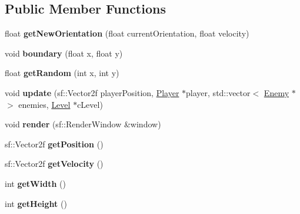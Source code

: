 \subsection*{Public Member Functions}
\begin{DoxyCompactItemize}
\item 
\mbox{\label{class_alien___nest_ab95047267d26135822ca8e7e0bc9db4c}} 
float {\bfseries get\+New\+Orientation} (float current\+Orientation, float velocity)
\item 
\mbox{\label{class_alien___nest_a01cf40be4d9bdb1da0eef820795e331d}} 
void {\bfseries boundary} (float x, float y)
\item 
\mbox{\label{class_alien___nest_aac52cb47dab7a0f9d8c3caf30ef7ecb5}} 
float {\bfseries get\+Random} (int x, int y)
\item 
\mbox{\label{class_alien___nest_aed015a2524d3f71f5c94e2b61f78d52a}} 
void {\bfseries update} (sf\+::\+Vector2f player\+Position, \mbox{\hyperlink{class_player}{Player}} $\ast$player, std\+::vector$<$ \mbox{\hyperlink{class_enemy}{Enemy}} $\ast$ $>$ enemies, \mbox{\hyperlink{class_level}{Level}} $\ast$c\+Level)
\item 
\mbox{\label{class_alien___nest_a2ec31dbb8294132204e7d8732b28017d}} 
void {\bfseries render} (sf\+::\+Render\+Window \&window)
\item 
\mbox{\label{class_alien___nest_ad1fe97aa53f3ade1eb4904edc3a0a599}} 
sf\+::\+Vector2f {\bfseries get\+Position} ()
\item 
\mbox{\label{class_alien___nest_a3b72683c62e86aa312014d81c76dde7c}} 
sf\+::\+Vector2f {\bfseries get\+Velocity} ()
\item 
\mbox{\label{class_alien___nest_a1f2e66f5aed35c33b58d1ccd906e65c0}} 
int {\bfseries get\+Width} ()
\item 
\mbox{\label{class_alien___nest_ae7306e80a0471341e9254ac87e592555}} 
int {\bfseries get\+Height} ()
\item 
\mbox{\label{class_alien___nest_aabf87cad33d2e3444bafe84e05aee024}} 

\end{DoxyCompactItemize}
